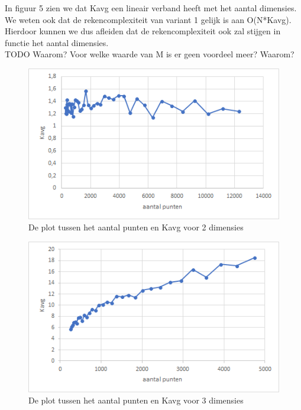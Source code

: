 \documentclass[12pt]{article}
\begin{document}
In figuur 5 zien we dat Kavg een lineair verband heeft met het aantal dimensies.
We weten ook dat de rekencomplexiteit van variant 1 gelijk is aan O(N*Kavg).
Hierdoor kunnen we dus afleiden dat de rekencomplexiteit ook zal stijgen in functie het aantal dimensies.
\\TODO Waarom? Voor welke waarde van M is er geen voordeel meer? Waarom?

\begin{figure}
\includegraphics[width=\textwidth]{punten-Kavg}
\caption{De plot tussen het aantal punten en Kavg voor 2 dimensies}
\end{figure}

\begin{figure}
\includegraphics[width=\textwidth]{punten-Kavgdim3.png}
\caption{De plot tussen het aantal punten en Kavg voor 3 dimensies}
\end{figure}
\end{document}
